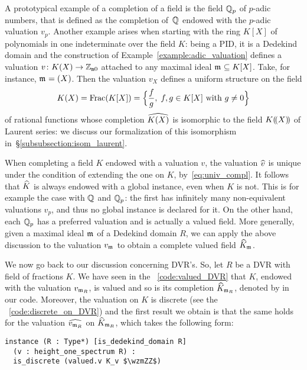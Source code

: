 \documentclass[sigplan,10pt, nonacm, review]{acmart}
\begin{document}
A prototypical example of a completion of a field is the field $\QQ_p$ of $p$-adic numbers, that is defined as the completion of~$\QQ$ endowed with the $p$-adic valuation $v_p$. Another example arises when starting with the ring $K[X]$ of polynomials in one indeterminate over the field $K$: being a PID, it is a Dedekind domain and the construction of Example~\ref{example:adic_valuation} defines a valuation $v\colon K(X)\to\wzmZZ$ attached to any maximal ideal $\maxid[\empty]\subseteq K[X]$. Take, for instance, $\maxid[\empty]=(X)$. Then the valuation $v_X$ defines a uniform structure on the field
\[
K(X)=\Frac(K[X])=\Bigl\{\frac{f}{g},\; f,g\in K[X]\text{ with }g\ne 0\Bigr\}
\]
of rational functions whose completion $\FpXCompl[K]$ is isomorphic to the field $\laurentseries[K]$ of Laurent series: we discuss our formalization of this isomorphism in~\S\ref{subsubsection:isom_laurent}.

When completing a field $K$ endowed with a valuation $v$, the valuation $\compl{v}$ is unique under the condition of extending the one on $K$, by~\eqref{eq:univ_compl}. It follows that $\compl{K}$ is always endowed with a global  instance, even when $K$ is not. This is for example the case with $\QQ$ and $\QQ_p$: the first has infinitely many non-equivalent valuations $v_p$, and thus no global  instance is declared for it. On the other hand, each $\QQ_p$ has a preferred valuation and is actually a valued field. More generally, given a maximal ideal $\maxid[\empty]$ of a Dedekind domain $R$, we can apply the above discussion to the valuation $v_{\maxid[\empty]}$ to obtain a complete valued field $\compl[{\maxid[\empty]}]{K}$\href{https://leanprover-community.github.io/mathlib_docs/ring_theory/dedekind_domain/adic_valuation.html#is_dedekind_domain.height_one_spectrum.valued_adic_completion}{\extlink}.

We now go back to our discussion concerning DVR's. So, let $R$ be a DVR with field of fractions $K$. We have seen in the \LClistingname~\ref{code:valued_DVR} that $K$, endowed with the valuation $v_{\maxid}$, is valued and so is its completion $\compl[\maxid]{K}$, denoted by  in our code. Moreover, the valuation on $K$ is discrete (see the \LClistingname~\ref{code:discrete_on_DVR}) and the first result we obtain is that the same holds for the valuation $\compl{v_{\maxid}}$ on $\compl[\maxid]{K}$, which takes the following form\href{https://github.com/LCFT-Lean/local_fields/blob/76ad487d09babdb0018f394a5634526637ee014a/src/discrete_valuation_ring/complete.lean#L58}{\extlink}:
\begin{lstlisting}
instance (R : Type*) [is_dedekind_domain R]
  (v : height_one_spectrum R) : 
  is_discrete (valued.v K_v $\wzmZZ$)
\end{lstlisting}
\end{document}
